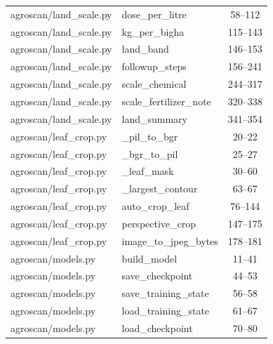 \begin{center}
\begin{longtable}{@{}p{4.6cm}p{5.2cm}c@{}}
agroscan/land\_scale.py & dose\_per\_litre & 58--112 \\
agroscan/land\_scale.py & kg\_per\_bigha & 115--143 \\
agroscan/land\_scale.py & land\_band & 146--153 \\
agroscan/land\_scale.py & followup\_steps & 156--241 \\
agroscan/land\_scale.py & scale\_chemical & 244--317 \\
agroscan/land\_scale.py & scale\_fertilizer\_note & 320--338 \\
agroscan/land\_scale.py & land\_summary & 341--354 \\
agroscan/leaf\_crop.py & \_pil\_to\_bgr & 20--22 \\
agroscan/leaf\_crop.py & \_bgr\_to\_pil & 25--27 \\
agroscan/leaf\_crop.py & \_leaf\_mask & 30--60 \\
agroscan/leaf\_crop.py & \_largest\_contour & 63--67 \\
agroscan/leaf\_crop.py & auto\_crop\_leaf & 76--144 \\
agroscan/leaf\_crop.py & perspective\_crop & 147--175 \\
agroscan/leaf\_crop.py & image\_to\_jpeg\_bytes & 178--181 \\
agroscan/models.py & build\_model & 11--41 \\
agroscan/models.py & save\_checkpoint & 44--53 \\
agroscan/models.py & save\_training\_state & 56--58 \\
agroscan/models.py & load\_training\_state & 61--67 \\
agroscan/models.py & load\_checkpoint & 70--80 \\
\bottomrule
\end{longtable}
\end{center}